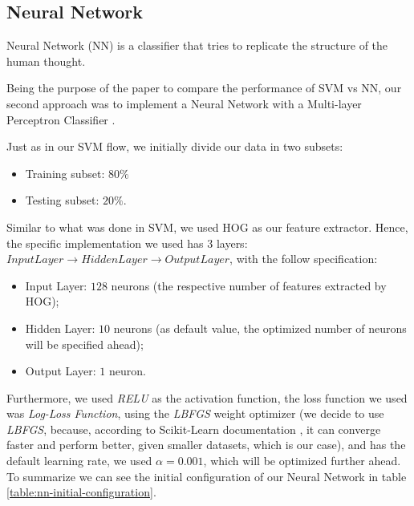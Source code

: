 \subsection{Neural Network}

Neural Network (NN) is a classifier that tries to replicate the structure of the human thought.

Being the purpose of the paper to compare the performance of SVM vs NN, our second approach was to implement a Neural Network with a Multi-layer Perceptron Classifier \cite{nn-mlp-classifier}.

Just as in our SVM flow, we initially divide our data in two subsets:

\begin{itemize} 
\item Training subset:  \(80\%\)
\item Testing subset:  \(20\%\).
\end{itemize}


Similar to what was done in SVM, we used HOG as our feature extractor. Hence, the specific implementation we used has 3 layers: \(Input Layer \rightarrow Hidden Layer \rightarrow Output Layer\), with the follow specification:

\begin{itemize} 
\item Input Layer: \(128\) neurons (the respective number of features extracted by HOG);
\item Hidden Layer: \(10\) neurons (as default value, the optimized number of neurons will be specified ahead);
\item Output Layer: \(1\) neuron.
\end{itemize}

Furthermore, we used \textit{RELU} as the activation function, the loss function we used was \textit{Log-Loss Function}, using the \textit{LBFGS} weight optimizer (we decide to use \textit{LBFGS}, because, according to Scikit-Learn documentation \cite{nn-mlp-classifier}, it can converge faster and perform better, given smaller datasets, which is our case), and has the default learning rate, we used \( \alpha = 0.001 \), which will be optimized further ahead. To summarize we can see the initial configuration of our Neural Network in table \ref{table:nn-initial-configuration}.

